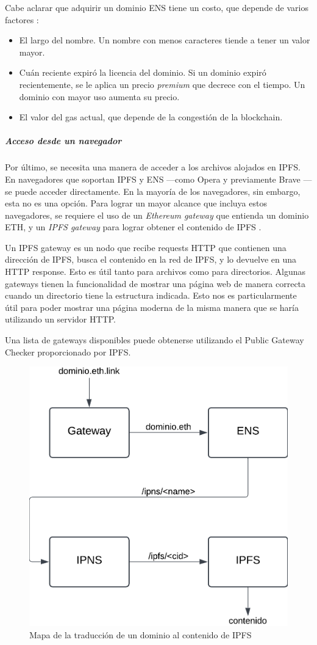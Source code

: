 Cabe aclarar que adquirir un dominio ENS tiene un costo, que depende de varios factores \cite{ens-price}:
\begin{itemize}
    \item El largo del nombre. Un nombre con menos caracteres tiende a tener un valor mayor.
    \item Cuán reciente expiró la licencia del dominio. Si un dominio expiró recientemente, se le aplica un precio \textit{premium} que decrece con el tiempo. Un dominio con mayor uso aumenta su precio.
    \item El valor del gas actual, que depende de la congestión de la blockchain.
\end{itemize}

\subparagraph{Acceso desde un navegador}

Por último, se necesita una manera de acceder a los archivos alojados en IPFS. En navegadores que soportan IPFS y ENS —como Opera \cite{opera-ipfs} y previamente Brave \cite{brave-ipfs}— se puede acceder directamente. En la mayoría de los navegadores, sin embargo, esta no es una opción. Para lograr un mayor alcance que incluya estos navegadores, se requiere el uso de un \textit{Ethereum gateway} que entienda un dominio ETH, y un \textit{IPFS gateway} para lograr obtener el contenido de IPFS \cite{ipfs-gateway}.

Un IPFS gateway es un nodo que recibe requests HTTP que contienen una dirección de IPFS, busca el contenido en la red de IPFS, y lo devuelve en una HTTP response. Esto es útil tanto para archivos como para directorios. Algunas gateways tienen la funcionalidad de mostrar una página web de manera correcta cuando un directorio tiene la estructura indicada. Esto nos es particularmente útil para poder mostrar una página moderna de la misma manera que se haría utilizando un servidor HTTP.

Una lista de gateways disponibles puede obtenerse utilizando el Public Gateway Checker \cite{public-gateway-checker} proporcionado por IPFS.

\begin{figure}[h!]
    \centering
    \includegraphics[width=0.5\linewidth]{img/solucion-ipfs/traduccion-dominio.png}
    \caption{Mapa de la traducción de un dominio al contenido de IPFS}
    \label{fig:traduccion-ipfs}
\end{figure}

